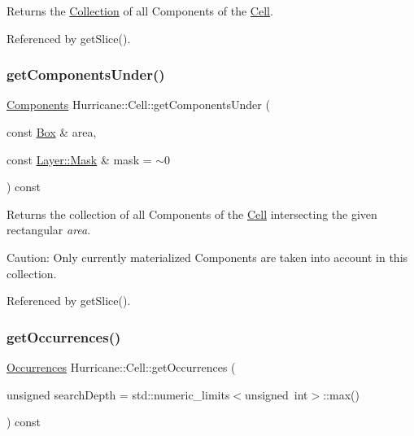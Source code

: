 Returns the \hyperlink{classHurricane_1_1Collection}{Collection} of all Components of the \hyperlink{classHurricane_1_1Cell}{Cell}. 

Referenced by get\+Slice().

\mbox{\label{classHurricane_1_1Cell_a0a3c54d755ab36fe74bd032dfd43b53a}} 
\subsubsection{\texorpdfstring{get\+Components\+Under()}{getComponentsUnder()}}
{\footnotesize\ttfamily \hyperlink{namespaceHurricane_a7d26d99aeb5dd6d70d51bd35d2473e72}{Components} Hurricane\+::\+Cell\+::get\+Components\+Under (\begin{DoxyParamCaption}\item[{const \hyperlink{classHurricane_1_1Box}{Box} \&}]{area,  }\item[{const \hyperlink{classHurricane_1_1Layer_af5277c670637bd5d910237e7afe01a91}{Layer\+::\+Mask} \&}]{mask = {\ttfamily $\sim$0} }\end{DoxyParamCaption}) const}

Returns the collection of all Components of the \hyperlink{classHurricane_1_1Cell}{Cell} intersecting the given rectangular {\itshape area}.

\begin{DoxyParagraph}{Caution\+:}
Only currently materialized Components are taken into account in this collection. 
\end{DoxyParagraph}


Referenced by get\+Slice().

\mbox{\label{classHurricane_1_1Cell_ab5bbab0a59106855d61deb94805e6115}} 
\subsubsection{\texorpdfstring{get\+Occurrences()}{getOccurrences()}}
{\footnotesize\ttfamily \hyperlink{namespaceHurricane_a1912927c128eee859af62dbe4cbe0a6b}{Occurrences} Hurricane\+::\+Cell\+::get\+Occurrences (\begin{DoxyParamCaption}\item[{unsigned}]{search\+Depth = {\ttfamily std\+:\+:numeric\+\_\+limits$<$unsigned~int$>$\+:\+:max()} }\end{DoxyParamCaption}) const}

